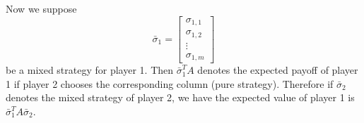 Now we suppose \[
    \bar{\sigma}_1=\begin{bmatrix}
        \sigma_{1,1}\\\sigma_{1,2}\\ \vdots \\ \sigma_{1,m}
    \end{bmatrix}
\] be a mixed strategy for player 1. Then $\bar\sigma_1^TA$ denotes the expected payoff of player 1 if player 2 chooses the corresponding column (pure strategy).
Therefore if $\bar\sigma_2$ denotes the mixed strategy of player 2, we have the expected value of player 1 is $\bar\sigma_1 ^T A\bar\sigma_2$.

